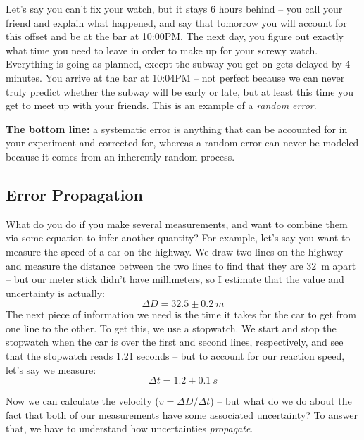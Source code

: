 \documentclass[12pt]{article}
\newcommand{\apwsim}{\raisebox{0.2ex}{\scriptsize$\sim$\normalsize}}
\begin{document}
Let's say you can't fix your watch, but it stays 6 hours behind -- you call your friend and explain what happened, and say that tomorrow you will account for this offset and be at the bar at 10:00PM. The next day, you figure out exactly what time you need to leave in order to make up for your screwy watch. Everything is going as planned, except the subway you get on gets delayed by 4 minutes. You arrive at the bar at 10:04PM -- not perfect because we can never truly predict whether the subway will be early or late, but at least this time you get to meet up with your friends. This is an example of a \emph{random error}.

\textbf{The bottom line:} a systematic error is anything that can be accounted for in your experiment and corrected for, whereas a random error can never be modeled because it comes from an inherently random process.

\subsection{Error Propagation}
\indent\indent What do you do if you make several measurements, and want to combine them via some equation to infer another quantity? For example, let's say you want to measure the speed of a car on the highway. We draw two lines on the highway and measure the distance between the two lines to find that they are \apwsim32~m apart -- but our meter stick didn't have millimeters, so I estimate that the value and uncertainty is actually:
\begin{equation}
	\Delta D = 32.5\pm0.2~m
\end{equation}
The next piece of information we need is the time it takes for the car to get from one line to the other. To get this, we use a stopwatch. We start and stop the stopwatch when the car is over the first and second lines, respectively, and see that the stopwatch reads 1.21 seconds -- but to account for our reaction speed, let's say we measure:
\begin{equation}
	\Delta t = 1.2\pm0.1~s
\end{equation}

Now we can calculate the velocity ($v = \Delta D/\Delta t$) -- but what do we do about the fact that both of our measurements have some associated uncertainty? To answer that, we have to understand how uncertainties \emph{propagate}.
\end{document}
